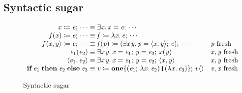 \documentclass[acmsmall,review,dvipsnames]{acmart}
\newcommand{\Varid}[1]{\mathit{#1}}
\begin{document}
\subsection{Syntactic sugar}

\begin{figure}
\setlength{\abovedisplayskip}{0pt}%
\setlength{\belowdisplayskip}{0pt}%
  $$
    \begin{array}{r@{\;}c@{\;}ll}
      \ensuremath{\Varid{x}\mathrel{\coloneqq}\Varid{e};\,\cdots} & \equiv & \ensuremath{\exists\Varid{x}.\,\Varid{x}\mathrel{=}\Varid{e};\,\cdots} \\
      \ensuremath{\Varid{f}(\Varid{x})\mathrel{\coloneqq}\Varid{e};\,\cdots} & \equiv & \ensuremath{\Varid{f}\mathrel{\coloneqq}\lambda\Varid{x}.\,\Varid{e};\,\cdots} \\
      \ensuremath{\Varid{f}\langle\Varid{x},\Varid{y}\rangle\mathrel{\coloneqq}\Varid{e};\,\cdots} & \equiv & \ensuremath{\Varid{f}(\Varid{p})\mathrel{\coloneqq}(\exists\Varid{x}\hspace{0.3mm}\Varid{y}.\,\Varid{p}\mathrel{=}\langle{}\Varid{x},\Varid{y}\rangle;\,\Varid{e});\,\cdots} & \text{\ensuremath{\Varid{p}} fresh} \\
      \ensuremath{\Varid{e}_{\mathrm{1}}(\Varid{e}_{\mathrm{2}})} & \equiv & \ensuremath{\exists\Varid{x}\hspace{0.3mm}\Varid{y}.\,\Varid{x}\mathrel{=}\Varid{e}_{\mathrm{1}};\,\Varid{y}\mathrel{=}\Varid{e}_{\mathrm{2}};\,\Varid{x}(\Varid{y})} & \text{\ensuremath{\Varid{x},\Varid{y}} fresh} \\
      \ensuremath{\langle{}\Varid{e}_{\mathrm{1}},\Varid{e}_{\mathrm{2}}\rangle} & \equiv & \ensuremath{\exists\Varid{x}\hspace{0.3mm}\Varid{y}.\,\Varid{x}\mathrel{=}\Varid{e}_{\mathrm{1}};\,\Varid{y}\mathrel{=}\Varid{e}_{\mathrm{2}};\,\langle{}\Varid{x},\Varid{y}\rangle} & \text{\ensuremath{\Varid{x},\Varid{y}} fresh} \\
      \ensuremath{\textbf{if}\;\Varid{e}_{\mathrm{1}}\;\textbf{then}\;\Varid{e}_{\mathrm{2}}\;\textbf{else}\;\Varid{e}_{\mathrm{3}}} & \equiv & \ensuremath{\Varid{v}\mathrel{\coloneqq}\textbf{one}\{(\Varid{e}_{\mathrm{1}};\,\lambda x.\,\Varid{e}_{\mathrm{2}})\;\rule[-0.3mm]{0.5mm}{2.5mm}\;(\lambda x.\,\Varid{e}_{\mathrm{3}})\};\,\Varid{v}\langle\rangle} & \text{\ensuremath{\Varid{v},\Varid{x}} fresh}
    \end{array}
  $$
\caption{Syntactic sugar}
\label{fig:sugar}
\end{figure}
\end{document}
